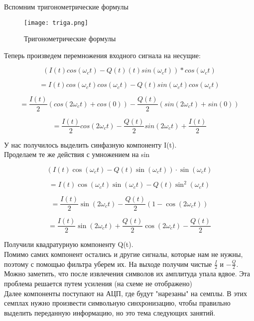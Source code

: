 Вспомним тригонометрические формулы

\begin{figure}[H]
    \centering
    \texttt{[image: triga.png]}
    \caption{Тригонометрические формулы}
\end{figure}

Теперь произведем перемножения входного сигнала на несущие:


$$(I(t)cos(\omega_ct)-Q(t)(t)sin(\omega_ct)) * cos(\omega_ct)$$

$$= I(t)cos(\omega_ct)cos(\omega_ct) - Q(t)sin(\omega_ct)cos(\omega_ct)$$

$$= \frac{I(t)}{2}(cos(2\omega_ct) + cos(0)) - \frac{Q(t)}{2}(sin(2\omega_ct) + sin(0))$$

$$= \frac{I(t)}{2}cos(2\omega_ct) - \frac{Q(t)}{2}sin(2\omega_ct) + \boxed{\frac{I(t)}{2}}$$

У нас получилось выделить синфазную компоненту I(t). \\

Проделаем те же действия с умножением на sin

\[
(I(t)\cos(\omega_c t) - Q(t)\sin(\omega_c t)) \cdot \sin(\omega_c t)
\]

\[
= I(t)\cos(\omega_c t)\sin(\omega_c t) - Q(t)\sin^2(\omega_c t)
\]

\[
= \frac{I(t)}{2}\sin(2\omega_c t) - \frac{Q(t)}{2}(1 - \cos(2\omega_c t))
\]

\[
= \frac{I(t)}{2}\sin(2\omega_c t) + \frac{Q(t)}{2}\cos(2\omega_c t) - \boxed{\frac{Q(t)}{2}}
\]

Получили квадратурную компоненту Q(t). \\


Помимо самих компонент остались и другие сигналы, которые нам не нужны, поэтому с помощью фильтра уберем их. На выходе получим чистые
$\frac{I}{2}$ и $-\frac{Q}{2}$. Можно заметить, что после извлечения символов их амплитуда упала вдвое. Эта проблема решается
путем усиления (на схеме не отображено)\\

Далее компоненты поступают на АЦП, где будут "нарезаны" на семплы. В этих семплах нужно произвести символьную синхронизацию, чтобы правильно выделить
переданную информацию, но это тема следующих занятий.

\endinput

